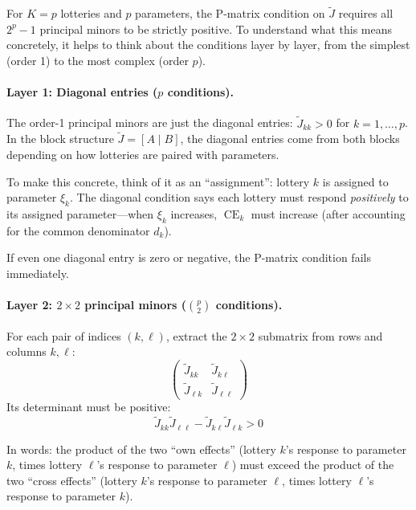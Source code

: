 \documentclass[11pt,a4paper]{article}
\theoremstyle{definition}
\DeclareMathOperator{\CE}{CE}
\begin{document}
For $K = p$ lotteries and $p$ parameters, the P-matrix condition on
$\widetilde{J}$ requires all $2^p - 1$ principal minors to be strictly
positive. To understand what this means concretely, it helps to think about
the conditions layer by layer, from the simplest (order 1) to the most
complex (order $p$).

\paragraph{Layer 1: Diagonal entries ($p$ conditions).}
The order-1 principal minors are just the diagonal entries:
$\widetilde{J}_{kk} > 0$ for $k = 1, \ldots, p$. In the block
structure $\widetilde{J} = [A \mid B]$, the diagonal entries come from both
blocks depending on how lotteries are paired with parameters.

To make this concrete, think of it as an ``assignment'': lottery $k$ is
assigned to parameter $\xi_k$. The diagonal condition says each lottery must
respond \emph{positively} to its assigned parameter---when $\xi_k$ increases,
$\CE_k$ must increase (after accounting for the common denominator $d_k$).

If even one diagonal entry is zero or negative, the P-matrix condition fails
immediately.

\paragraph{Layer 2: $2 \times 2$ principal minors ($\binom{p}{2}$ conditions).}
For each pair of indices $(k, \ell)$, extract the $2 \times 2$ submatrix
from rows and columns $k, \ell$:
\begin{equation}
    \begin{pmatrix}
        \widetilde{J}_{kk} & \widetilde{J}_{k\ell} \\
        \widetilde{J}_{\ell k} & \widetilde{J}_{\ell\ell}
    \end{pmatrix}
\end{equation}
Its determinant must be positive:
\begin{equation}
    \widetilde{J}_{kk}\widetilde{J}_{\ell\ell} -
    \widetilde{J}_{k\ell}\widetilde{J}_{\ell k} > 0
\end{equation}

In words: the product of the two ``own effects'' (lottery $k$'s response to
parameter $k$, times lottery $\ell$'s response to parameter $\ell$) must
exceed the product of the two ``cross effects'' (lottery $k$'s response to
parameter $\ell$, times lottery $\ell$'s response to parameter $k$).
\end{document}
